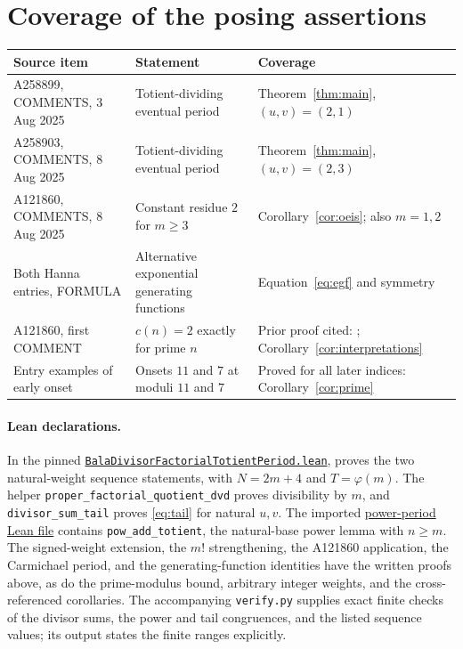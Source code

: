 \documentclass[11pt]{article}
\begin{document}
\section{Coverage of the posing assertions}
\begin{center}\small
\begin{tabular}{@{}>{\raggedright\arraybackslash}p{}>{\raggedright\arraybackslash}p{}>{\raggedright\arraybackslash}p{}@{}}
\toprule
Source item & Statement & Coverage \\
\midrule
A258899, COMMENTS, 3 Aug 2025 & Totient-dividing eventual period & Theorem~\ref{thm:main}, $(u,v)=(2,1)$ \\
A258903, COMMENTS, 8 Aug 2025 & Totient-dividing eventual period & Theorem~\ref{thm:main}, $(u,v)=(2,3)$ \\
A121860, COMMENTS, 8 Aug 2025 & Constant residue $2$ for $m\geq3$ & Corollary~\ref{cor:oeis}; also $m=1,2$ \\
Both Hanna entries, FORMULA & Alternative exponential generating functions & Equation~\eqref{eq:egf} and symmetry \\
A121860, first COMMENT & $c(n)=2$ exactly for prime $n$ & Prior proof cited: \cite[Corollary 4.15]{dk}; Corollary~\ref{cor:interpretations} \\
Entry examples of early onset & Onsets $11$ and $7$ at moduli $11$ and $7$ & Proved for all later indices: Corollary~\ref{cor:prime} \\
\bottomrule
\end{tabular}
\end{center}

\begingroup\raggedright
\paragraph{Lean declarations.}
In the pinned
\href{https://github.com/the-omega-institute/trureturing/blob/eb2703740e8b4b97e408a80b2eb0d0940939dfc3/D5/S1/Recurrence/Periodic/BalaDivisorFactorialTotientPeriod.lean}{\texttt{BalaDivisorFactorialTotientPeriod.lean}},
proves the two natural-weight sequence statements, with
$N=2m+4$ and $T=\varphi(m)$.
The helper \texttt{proper\_factorial\_quotient\_dvd} proves divisibility
by $m$, and \texttt{divisor\_sum\_tail} proves \eqref{eq:tail} for
natural $u,v$. The imported
\href{https://github.com/the-omega-institute/trureturing/blob/eb2703740e8b4b97e408a80b2eb0d0940939dfc3/D5/S1/Recurrence/Periodic/StirlingTransformTotientPeriod.lean}{power-period Lean file}
contains \texttt{pow\_add\_totient}, the natural-base power lemma with
$n\geq m$. The signed-weight extension, the $m!$ strengthening,
the A121860 application, the Carmichael period, and the generating-function
identities have the written proofs above, as do the prime-modulus bound,
arbitrary integer weights, and the cross-referenced corollaries.
The accompanying \texttt{verify.py} supplies exact finite checks of the
divisor sums, the power and tail congruences, and the listed sequence values;
its output states the finite ranges explicitly.\par
\endgroup
\end{document}
